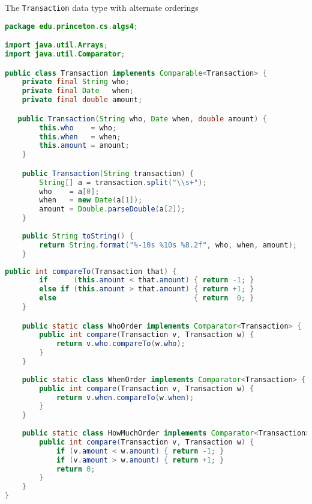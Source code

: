 \documentclass[8pt,a4paper,compress]{beamer}
\begin{document}
\begin{frame}[fragile]
\pause

The \lstinline{Transaction} data type with alternate orderings

\smallskip

\begin{lstlisting}[language=Java,style=focusin]
package edu.princeton.cs.algs4;

import java.util.Arrays;
import java.util.Comparator;

public class Transaction implements Comparable<Transaction> {  
    private final String who;
    private final Date   when; 
    private final double amount;

   public Transaction(String who, Date when, double amount) {
        this.who    = who;
        this.when   = when;
        this.amount = amount;
    }

    public Transaction(String transaction) {
        String[] a = transaction.split("\\s+");
        who    = a[0];
        when   = new Date(a[1]);
        amount = Double.parseDouble(a[2]);
    }
    
    public String toString() {
        return String.format("%-10s %10s %8.2f", who, when, amount);
    }
\end{lstlisting}
\end{frame}

\begin{frame}[fragile]
\pause

\begin{lstlisting}[language=Java,style=focusin]
    public int compareTo(Transaction that) {
        if      (this.amount < that.amount) { return -1; }
        else if (this.amount > that.amount) { return +1; }
        else                                { return  0; }
    }    

    public static class WhoOrder implements Comparator<Transaction> {
        public int compare(Transaction v, Transaction w) { 
            return v.who.compareTo(w.who); 
        }        
    }
    
    public static class WhenOrder implements Comparator<Transaction> {
        public int compare(Transaction v, Transaction w) { 
            return v.when.compareTo(w.when); 
        }
    }
    
    public static class HowMuchOrder implements Comparator<Transaction> {
        public int compare(Transaction v, Transaction w) {
            if (v.amount < w.amount) { return -1; }
            if (v.amount > w.amount) { return +1; }
            return 0;
        }
    }
}
\end{lstlisting}
\end{frame}
\end{document}
